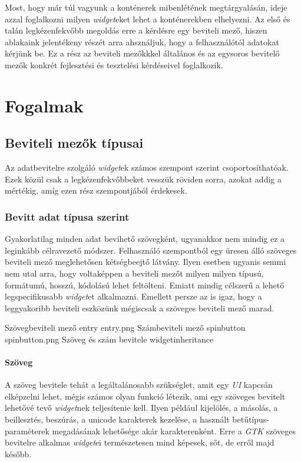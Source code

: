 Most, hogy már túl vagyunk a konténerek mibenlétének megtárgyalásán, ideje azzal foglalkozni milyen \textit{widget}eket lehet a konténerekben elhelyezni. Az első és talán legkézenfekvőbb megoldás erre a kérdésre egy beviteli mező, hiszen ablakaink jelentékeny részét arra ahsználjuk, hogy a felhasználótól adatokat kérjünk be. Ez a rész az beviteli mezőkkkel általános és az egysoros bevitelő mezők konkrét fejlesztési és tesztelési kérdéseivel foglalkozik.

\section{Fogalmak}

\subsection{Beviteli mezők típusai}

Az adatbevitelre szolgáló \textit{widget}ek számos szempont szerint csoportosíthatóak. Ezek közül csak a legkézenfekvőbbeket vesszük röviden sorra, azokat addig a mértékig, amíg ezen rész szempontjából érdekesek.

\subsubsection{Bevitt adat típusa szerint}

Gyakorlatilag minden adat bevihető szövegként, ugyanakkor nem mindig ez a leginkább célravezető módszer. Felhasználó szempontból egy üresen álló szöveges beviteli mező meglehetősen kétségbeejtő látvány. Ilyen esetben ugyanis semmi nem utal arra, hogy voltaképpen a beviteli mezőt milyen milyen típusú, formátumú, hosszú, kódolású lehet feltölteni. Emiatt mindig célszerű a lehető legspecifikusabb \textit{widget}et alkalmazni. Emellett persze az is igaz, hogy a leggyakoribb beviteli eszközünk mégiscsak a szöveges beviteli mező marad.

{Szövegbeviteli mező}
{entry}
{entry.png}
{Számbeviteli mező}
{spinbutton}
{spinbutton.png}
{Szöveg és szám bevitele}
{widgetinheritance}


\paragraph{Szöveg}

A szöveg bevitele tehát a legáltalánosabb szükséglet, amit egy \textit{UI} kapcsán elképzelni lehet, mégis számos olyan funkció létezik, ami egy szöveges bevitelt lehetővé tevő \textit{widget}nek teljesítenie kell. Ilyen például kijelölés, a másolás, a beillesztés, beszúrás, a unicode karakterek kezelése, a használt betűtípus-paraméterek megadásának lehetősége akár karakterenként. Erre a \textit{GTK} szöveges bevitelre alkalmas \textit{widget}ei természetesen mind képesek, sőt, de erről majd később.

